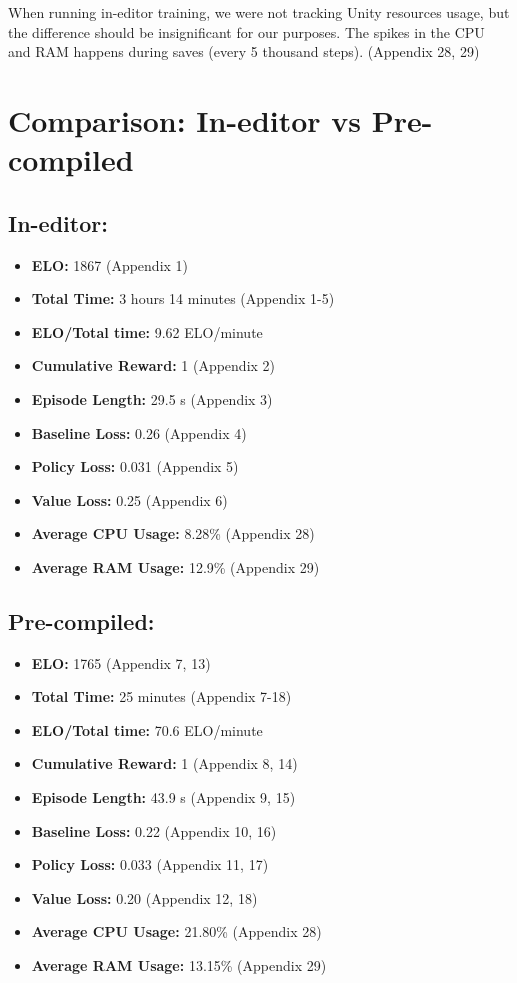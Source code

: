 \documentclass{LSkill}
\renewcommand\normalsize{\fontsize{9}{11}\selectfont}
\begin{document}
When running in-editor training, we were not tracking Unity resources usage, but the difference should be insignificant for our purposes. The spikes in the CPU and RAM happens during saves (every 5 thousand steps). (Appendix 28, 29) 

\section*{\normalsize Comparison: In-editor vs Pre-compiled}


\subsection*{\normalsize In-editor:}
\begin{itemize}
    \item \textbf{ELO:} 1867 (Appendix 1)
    \item \textbf{Total Time:} 3 hours 14 minutes (Appendix 1-5)
    \item \textbf{ELO/Total time:} 9.62 ELO/minute
    \item \textbf{Cumulative Reward:} 1 (Appendix 2)
    \item \textbf{Episode Length:} 29.5 s (Appendix 3)
    \item \textbf{Baseline Loss:} 0.26 (Appendix 4)
    \item \textbf{Policy Loss:} 0.031 (Appendix 5)
    \item \textbf{Value Loss:} 0.25 (Appendix 6)
    \item \textbf{Average CPU Usage:} 8.28\% (Appendix 28)
    \item \textbf{Average RAM Usage:} 12.9\% (Appendix 29)
\end{itemize}

\subsection*{\normalsize Pre-compiled:}
\begin{itemize}
    \item \textbf{ELO:} 1765 (Appendix 7, 13)
    \item \textbf{Total Time:} 25 minutes (Appendix 7-18)
    \item \textbf{ELO/Total time:} 70.6 ELO/minute
    \item \textbf{Cumulative Reward:} 1 (Appendix 8, 14)
    \item \textbf{Episode Length:} 43.9 s (Appendix 9, 15)
    \item \textbf{Baseline Loss:} 0.22 (Appendix 10, 16)
    \item \textbf{Policy Loss:} 0.033 (Appendix 11, 17)
    \item \textbf{Value Loss:} 0.20 (Appendix 12, 18)
    \item \textbf{Average CPU Usage:} 21.80\% (Appendix 28)
    \item \textbf{Average RAM Usage:} 13.15\% (Appendix 29)
\end{itemize}
\end{document}
